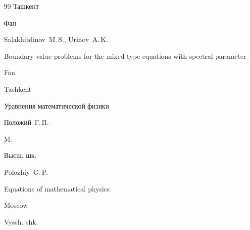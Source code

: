 \begin{thebibliography}{99}
\publaddr Ташкент


\publ Фан


\misctransl

\by Salakhitdinov~M.\,S., Urinov~A.\,K.

\book Boundary value problems for the mixed type equations with spectral parameter

\publ Fan

\publaddr Tashkent








\book Уравнения математической физики

\by Положий~Г.\,П.

\publaddr M.

\publ Высш. шк.



\misctransl

\by Polozhiy~G.\,P.

\book Equations of mathematical physics

\publaddr Moscow

\publ Vyssh. shk.





\end{thebibliography}



\noindent

\hskip6.5cm \thedate \par\noindent

\hskip6.5cm\therevdate



\vspace{-2mm}



\makeengtitle



\newpage

%

%